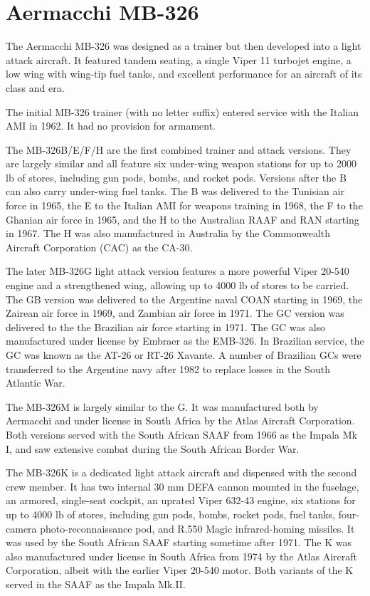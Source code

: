 \section{Aermacchi MB-326}

The Aermacchi MB-326 was designed as a trainer but then developed into a light attack aircraft. It featured tandem seating, a single Viper 11 turbojet engine, a low wing with wing-tip fuel tanks, and excellent performance for an aircraft of its class and era.

The initial MB-326 trainer (with no letter suffix) entered service with the Italian AMI in 1962. It had no provision for armament.

The MB-326B/E/F/H are the first combined trainer and attack versions. They are largely similar and all feature six under-wing weapon stations for up to 2000 lb of stores, including gun pods, bombs, and rocket pods. Versions after the B can also carry under-wing fuel tanks. The B was delivered to the Tunisian air force in 1965, the E to the Italian AMI for weapons training in 1968, the F to the Ghanian air force in 1965, and the H to the Australian RAAF and RAN starting in 1967. The H was also manufactured in Australia by the Commonwealth Aircraft Corporation (CAC) as the CA-30.

The later MB-326G light attack version features a more powerful Viper 20-540 engine and a strengthened wing, allowing up to 4000 lb of stores to be carried. The GB version was delivered to the Argentine naval COAN starting in 1969, the Zairean air force in 1969, and Zambian air force in 1971. The GC version was delivered to the the Brazilian air force starting in 1971. The GC was also manufactured under license by Embraer as the EMB-326. In Brazilian service, the GC was known as the AT-26 or RT-26 Xavante. A number of Brazilian GCs were transferred to the Argentine navy after 1982 to replace losses in the South Atlantic War.

The MB-326M is largely similar to the G. It was manufactured both by Aermacchi and under license in South Africa by the Atlas Aircraft Corporation. Both versions served with the South African SAAF from 1966 as the Impala Mk I, and saw extensive combat during the South African Border War.

The MB-326K is a dedicated light attack aircraft and dispensed with the second crew member. It has two internal 30 mm DEFA cannon mounted in the fuselage, an armored, single-seat cockpit, an uprated Viper 632-43 engine, six stations for up to 4000 lb of stores, including gun pods, bombs, rocket pods, fuel tanks, four-camera photo-reconnaissance pod, and R.550 Magic infrared-homing missiles. It was used by the South African SAAF starting sometime after 1971. The K was also manufactured under license in South Africa from 1974 by the Atlas Aircraft Corporation, albeit with the earlier Viper 20-540 motor. Both variants of the K served in the SAAF as the Impala Mk.II.

